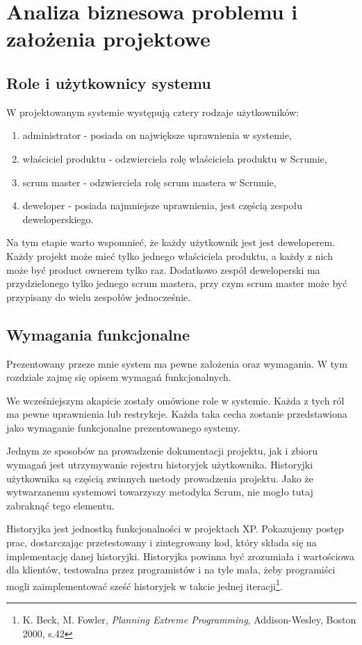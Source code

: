 \chapter{Analiza biznesowa problemu i założenia projektowe}

\section{Role i użytkownicy systemu}
W projektowanym systemie występują cztery rodzaje użytkowników:

\begin{enumerate}
	\item administrator - posiada on największe uprawnienia w systemie,
	\item właściciel produktu - odzwierciela rolę właściciela produktu w Scrumie,
	\item scrum master - odzwierciela rolę scrum mastera w Scrumie,
	\item deweloper - posiada najmniejsze uprawnienia, jest częścią zespołu deweloperskiego.
\end{enumerate} 

Na tym etapie warto wspomnieć, że każdy użytkownik jest jest deweloperem. Każdy projekt może mieć tylko jednego właściciela produktu, a każdy z nich może być product ownerem tylko raz. Dodatkowo zespół deweloperski ma przydzielonego tylko jednego scrum mastera, przy czym scrum master może być przypisany do wielu zespołów jednocześnie.

\section{Wymagania funkcjonalne}
Prezentowany przeze mnie system ma pewne założenia oraz wymagania. W tym rozdziale zajmę się opisem wymagań funkcjonalnych. 

We wcześniejszym akapicie zostały omówione role w systemie. Każda z tych ról ma pewne uprawnienia lub restrykcje. Każda taka cecha zostanie przedstawiona jako wymaganie funkcjonalne prezentowanego systemy.

Jednym ze sposobów na prowadzenie dokumentacji projektu, jak i zbioru wymagań jest utrzymywanie rejestru historyjek użytkownika. Historyjki użytkownika są częścią zwinnych metody prowadzenia projektu. Jako że wytwarzanemu systemowi towarzyszy metodyka Scrum, nie mogło tutaj zabraknąć tego elementu.

\begin{italicquote}
	Historyjka jest jednostką funkcjonalności w projektach XP. Pokazujemy postęp prac, dostarczając przetestowany i zintegrowany kod, który składa się na implementację danej historyjki. Historyjka powinna być zrozumiała i wartościowa dla klientów, testowalna przez programistów i na tyle mała, żeby programiści mogli zaimplementować sześć historyjek w takcie jednej iteracji\footnote{K. Beck, M. Fowler, \textit{Planning Extreme Programming}, Addison-Wesley, Boston 2000, s.42}.
\end{italicquote}

